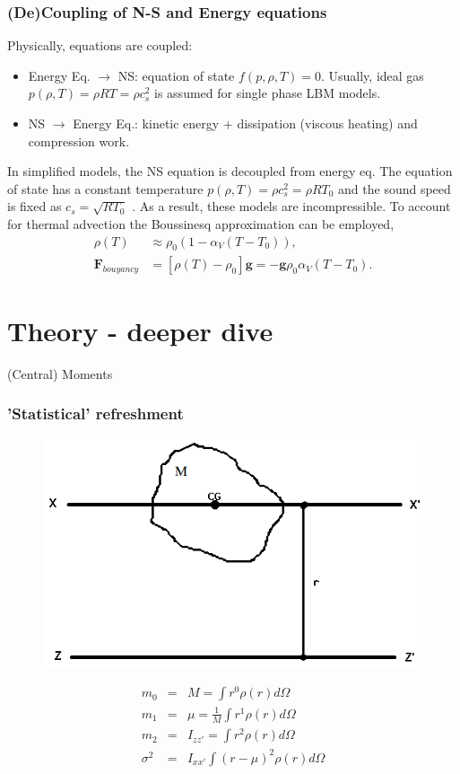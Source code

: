 \documentclass[10pt]{beamer}
\begin{document}
\begin{frame}\frametitle{(De)Coupling of N-S and Energy equations}
Physically, equations are coupled:
\begin{itemize}
\item Energy Eq. $ \rightarrow $ NS: equation of state $f(p,\rho,T) = 0 $. \newline 
Usually, ideal gas $p(\rho, T) = \rho R T = \rho c_s^2 $ is assumed for single phase LBM models.
\item NS $ \rightarrow $ Energy Eq.: kinetic energy + dissipation (viscous heating) and compression work.
\end{itemize}
\pause
In simplified models, the NS equation is decoupled from energy eq.
The equation of state has a constant temperature $p(\rho, T) = \rho c_s^2 = \rho R T_0 $ and the sound speed is fixed as $c_s = \sqrt{R T_0}$ . \linebreak
As a result, these models are incompressible. \newline
To account for thermal advection the Boussinesq approximation can be employed,
\begin{align*} 
\rho(T) & \approx \rho_0 (1- \alpha_V (T-T_0)), \\
\boldsymbol{F}_{bouyancy} &= [\rho(T) - \rho_0] \boldsymbol{g} = - \boldsymbol{g} \rho_0 \alpha_V (T-T_0).
\end{align*} 
\end{frame}


\section{Theory - deeper dive}
\begin{frame}[standout]
    (Central) Moments
\end{frame}
\begin{frame}[plain]\frametitle{'Statistical' refreshment}

\begin{figure}[H]
\includegraphics[width = 0.5 \textwidth]{obrazki/ParallelaxesTheory.png} 
\end{figure}
\pause
\begin{eqnarray}\nonumber
m_0 &=& M = \int r^0 \rho(r) d \Omega \\ \nonumber
m_1 &=& \mu = \frac{1}{M}\int r^1 \rho(r) d \Omega \\ \nonumber
m_2 &=& I_{zz'} = \int r^2 \rho(r) d \Omega \\ \nonumber
\sigma ^2 &=&  I_{xx'}\int (r - \mu)^2 \rho(r) d \Omega \nonumber 
\end{eqnarray}

\end{frame}
\end{document}
